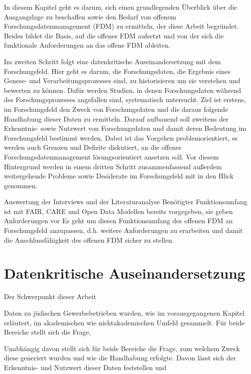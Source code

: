 \onehalfspacing

In diesem Kapitel geht es darum, sich einen grundlegenden Überblick über die Ausgangslage zu beschaffen sowie den Bedarf von offenem Forschungsdatenmanagement (FDM) zu ermitteln, der diese Arbeit begründet. Beides bildet die Basis, auf die offenes FDM aufsetzt und von der sich die funktionale Anforderungen an das offene FDM ableiten. 

Im zweiten Schritt folgt eine datenkritische Auseinandersetzung mit dem Forschungsfeld. Hier geht es darum, die Forschungsdaten, die Ergebnis eines Genese- und Verarbeitungsprozesses sind, zu historisieren um sie verstehen und bewerten zu können. Dafür werden Studien, in denen Forschungsdaten während des Forschungsprozesses angefallen sind, systematisch untersucht. Ziel ist erstens, im Forschungsfeld den Zweck von Forschungsdaten und die daraus folgende Handhabung dieser Daten zu ermitteln. Darauf aufbauend soll zweitens der Erkenntnis- sowie Nutzwert von Forschungsdaten und damit deren Bedeutung im Forschungsfeld bestimmt werden. Dabei ist das Vorgehen problemorientiert, es werden auch Grenzen und Defizite diskutiert, an die offenes Forschungsdatenmanagement lösungsorientiert ansetzen soll. Vor diesem Hintergrund werden in einem dritten Schritt zusammenfassend außerdem weitergehende Probleme sowie Desiderate im Forschungsfeld mit in den Blick genommen.

Auswertung der Interviews und der Literaturanalyse
Benötigter Funktionsumfang ist mit FAIR, CARE und Open Data Modellen bereits vorgegeben, sie geben Anforderungen vor
Es geht um diesen Funktionsumfang des offenen FDM an Forschungsfeld anzupassen, d.h. weitere Anforderungen zu erarbeiten und damit die Anschlussfähigkeit des offenen FDM sicher zu stellen.

\section{Datenkritische Auseinandersetzung}

Der Schwerpunkt dieser Arbeit


Daten zu jüdischen Gewerbebetrieben wurden, wie im vorausgegangenen Kapitel erläutert, im akademischen wie nichtakademischen Umfeld gesammelt. Für beide Bereiche stellt sich die Frage, 

Unabhängig davon stellt sich für beide Bereiche die Frage, zum welchem Zweck diese generiert wurden und wie die Handhabung erfolgte. Davon lässt sich der Erkenntnis- und Nutzwert dieser Daten feststellen und 


